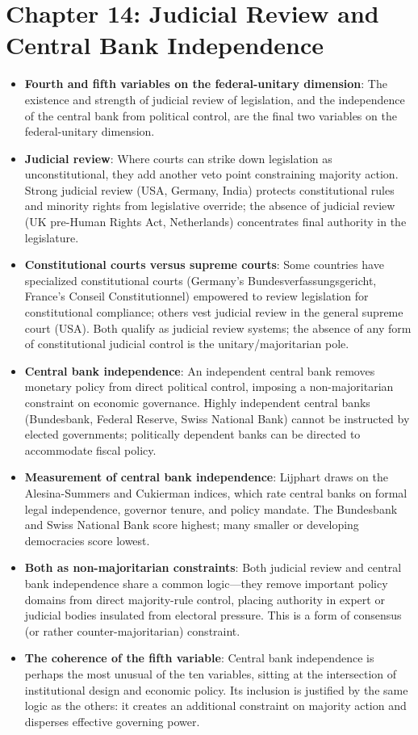 \documentclass[12pt]{article}
\begin{document}
\section{Chapter 14: Judicial Review and Central Bank Independence}

\begin{itemize}[leftmargin=*, itemsep=4pt]
    \item \textbf{Fourth and fifth variables on the federal-unitary dimension}: The existence and strength of judicial review of legislation, and the independence of the central bank from political control, are the final two variables on the federal-unitary dimension.
    \item \textbf{Judicial review}: Where courts can strike down legislation as unconstitutional, they add another veto point constraining majority action. Strong judicial review (USA, Germany, India) protects constitutional rules and minority rights from legislative override; the absence of judicial review (UK pre-Human Rights Act, Netherlands) concentrates final authority in the legislature.
    \item \textbf{Constitutional courts versus supreme courts}: Some countries have specialized constitutional courts (Germany's Bundesverfassungsgericht, France's Conseil Constitutionnel) empowered to review legislation for constitutional compliance; others vest judicial review in the general supreme court (USA). Both qualify as judicial review systems; the absence of any form of constitutional judicial control is the unitary/majoritarian pole.
    \item \textbf{Central bank independence}: An independent central bank removes monetary policy from direct political control, imposing a non-majoritarian constraint on economic governance. Highly independent central banks (Bundesbank, Federal Reserve, Swiss National Bank) cannot be instructed by elected governments; politically dependent banks can be directed to accommodate fiscal policy.
    \item \textbf{Measurement of central bank independence}: Lijphart draws on the Alesina-Summers and Cukierman indices, which rate central banks on formal legal independence, governor tenure, and policy mandate. The Bundesbank and Swiss National Bank score highest; many smaller or developing democracies score lowest.
    \item \textbf{Both as non-majoritarian constraints}: Both judicial review and central bank independence share a common logic---they remove important policy domains from direct majority-rule control, placing authority in expert or judicial bodies insulated from electoral pressure. This is a form of consensus (or rather counter-majoritarian) constraint.
    \item \textbf{The coherence of the fifth variable}: Central bank independence is perhaps the most unusual of the ten variables, sitting at the intersection of institutional design and economic policy. Its inclusion is justified by the same logic as the others: it creates an additional constraint on majority action and disperses effective governing power.
\end{itemize}
\end{document}
